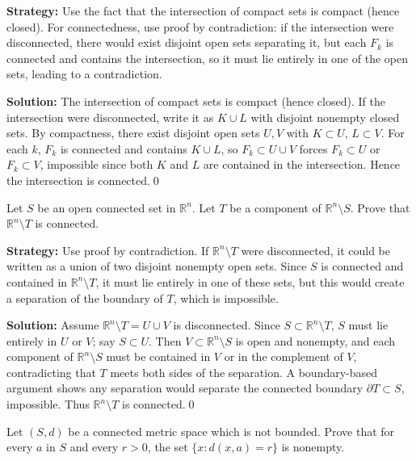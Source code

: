 \noindent\textbf{Strategy:} Use the fact that the intersection of compact sets is compact (hence closed). For connectedness, use proof by contradiction: if the intersection were disconnected, there would exist disjoint open sets separating it, but each $F_k$ is connected and contains the intersection, so it must lie entirely in one of the open sets, leading to a contradiction.

\bigskip\noindent\textbf{Solution:}
The intersection of compact sets is compact (hence closed). If the intersection were disconnected, write it as $K\cup L$ with disjoint nonempty closed sets. By compactness, there exist disjoint open sets $U,V$ with $K\subset U$, $L\subset V$. For each $k$, $F_k$ is connected and contains $K\cup L$, so $F_k\subset U\cup V$ forces $F_k\subset U$ or $F_k\subset V$, impossible since both $K$ and $L$ are contained in the intersection. Hence the intersection is connected.\qed



\begin{problembox}
\begin{problemstatement}
Let $S$ be an open connected set in $\mathbb{R}^n$. Let $T$ be a component of $\mathbb{R}^n \setminus S$. Prove that $\mathbb{R}^n \setminus T$ is connected.
\end{problemstatement}
\end{problembox}

\noindent\textbf{Strategy:} Use proof by contradiction. If $\mathbb{R}^n \setminus T$ were disconnected, it could be written as a union of two disjoint nonempty open sets. Since $S$ is connected and contained in $\mathbb{R}^n \setminus T$, it must lie entirely in one of these sets, but this would create a separation of the boundary of $T$, which is impossible.

\bigskip\noindent\textbf{Solution:}
Assume $\mathbb{R}^n\setminus T=U\cup V$ is disconnected. Since $S\subset\mathbb{R}^n\setminus T$, $S$ must lie entirely in $U$ or $V$; say $S\subset U$. Then $V\subset \mathbb{R}^n\setminus S$ is open and nonempty, and each component of $\mathbb{R}^n\setminus S$ must be contained in $V$ or in the complement of $V$, contradicting that $T$ meets both sides of the separation. A boundary-based argument shows any separation would separate the connected boundary $\partial T\subset S$, impossible. Thus $\mathbb{R}^n\setminus T$ is connected.\qed



\begin{problembox}
\begin{problemstatement}
Let $(S, d)$ be a connected metric space which is not bounded. Prove that for every $a$ in $S$ and every $r > 0$, the set $\{x : d(x, a) = r\}$ is nonempty.
\end{problemstatement}
\end{problembox}

